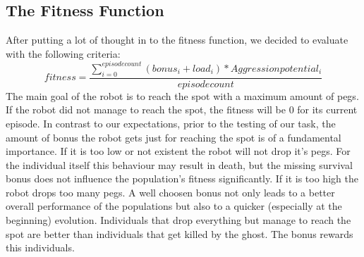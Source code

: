 \documentclass[12pt,fleqn,a4paper]{article}
\begin{document}
\subsection{The Fitness Function}
After putting a lot of thought in to the fitness function, we decided to evaluate with the following criteria:
\[ fitness = \frac{\sum_{i=0}^{episodecount} (bonus_i + load_i)*Aggressionpotential_i}{episodecount} \]
The main goal of the robot is to reach the spot with a maximum amount of pegs. 
If the robot did not manage to reach the spot, the fitness will be 0 for its current episode.
In contrast to our expectations, prior to the testing of our task, the amount of bonus the robot gets just for reaching the spot is of a fundamental importance. If it is too low or not existent the robot will not drop it's pegs. For the individual itself this behaviour may result in death, but the missing survival bonus does not influence the population's fitness significantly. If it is too high the robot drops too many pegs. A well choosen bonus not only leads to a better overall performance of the populations but also to a quicker (especially at the beginning) evolution. Individuals that drop everything but manage to reach the spot are better than individuals that get killed by the ghost. The bonus rewards this individuals. 
 
\end{document}
